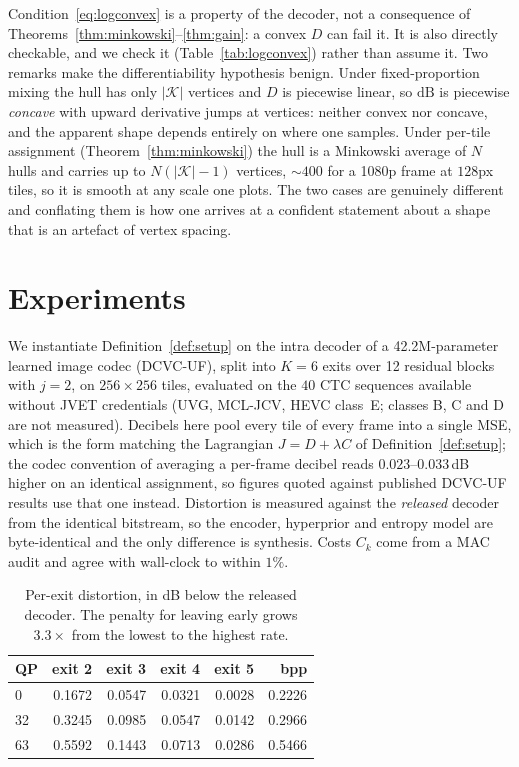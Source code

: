 \documentclass[10pt]{article}
\theoremstyle{plain}
\theoremstyle{definition}
\begin{document}
Condition~\eqref{eq:logconvex} is a property of the decoder, not a consequence
of Theorems~\ref{thm:minkowski}--\ref{thm:gain}: a convex $D$ can fail it. It is
also directly checkable, and we check it (Table~\ref{tab:logconvex}) rather than
assume it. Two remarks make the differentiability hypothesis benign. Under
fixed-proportion mixing the hull has only $|\mathcal{K}|$ vertices and $D$ is
piecewise linear, so $\mathrm{dB}$ is piecewise \emph{concave} with upward
derivative jumps at vertices: neither convex nor concave, and the apparent
shape depends entirely on where one samples. Under per-tile assignment
(Theorem~\ref{thm:minkowski}) the hull is a Minkowski average of $N$ hulls and
carries up to $N(|\mathcal{K}|-1)$ vertices, $\sim\!400$ for a 1080p frame at
$128$px tiles, so it is smooth at any scale one plots. The two cases are
genuinely different and conflating them is how one arrives at a confident
statement about a shape that is an artefact of vertex spacing.

\section{Experiments}

We instantiate Definition~\ref{def:setup} on the intra decoder of a
42.2M-parameter learned image codec (DCVC-UF), split into $K=6$ exits over 12
residual blocks with $j=2$, on $256\times256$ tiles, evaluated on the $40$ CTC
sequences available without JVET credentials (UVG, MCL-JCV, HEVC class~E;
classes B, C and D are not measured). Decibels here pool every tile of every
frame into a single MSE, which is the form matching the Lagrangian
$J=D+\lambda C$ of Definition~\ref{def:setup}; the codec convention of averaging
a per-frame decibel reads $0.023$--$0.033$\,dB higher on an identical
assignment, so figures quoted against published DCVC-UF results use that one
instead. Distortion is measured against the \emph{released} decoder from the
identical bitstream, so the encoder, hyperprior and entropy model are
byte-identical and the only difference is synthesis. Costs $C_k$ come from a
MAC audit and agree with wall-clock to within $1\%$.

\begin{table}[h]\centering\small
\caption{Per-exit distortion, in dB below the released decoder. The penalty for
leaving early grows $3.3\times$ from the lowest to the highest rate.}
\label{tab:exits}
\begin{tabular}{lrrrrr}
\toprule
QP & exit 2 & exit 3 & exit 4 & exit 5 & bpp \\
\midrule
0  & 0.1672 & 0.0547 & 0.0321 & 0.0028 & 0.2226 \\
32 & 0.3245 & 0.0985 & 0.0547 & 0.0142 & 0.2966 \\
63 & 0.5592 & 0.1443 & 0.0713 & 0.0286 & 0.5466 \\
\bottomrule
\end{tabular}
\end{table}
\end{document}
